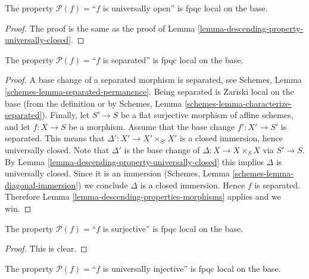 \begin{lemma}
\label{lemma-descending-property-universally-open}
The property $\mathcal{P}(f) =$``$f$ is universally open''
is fpqc local on the base.
\end{lemma}

\begin{proof}
The proof is the same as the proof of
Lemma \ref{lemma-descending-property-universally-closed}.
\end{proof}

\begin{lemma}
\label{lemma-descending-property-separated}
The property $\mathcal{P}(f) =$``$f$ is separated''
is fpqc local on the base.
\end{lemma}

\begin{proof}
A base change of a separated morphism is separated, see
Schemes, Lemma \ref{schemes-lemma-separated-permanence}.
Being separated is Zariski local on the base (from the
definition or by
Schemes, Lemma \ref{schemes-lemma-characterize-separated}).
Finally, let
$S' \to S$ be a flat surjective morphism of affine schemes,
and let $f : X \to S$ be a morphism. Assume that the base change
$f' : X' \to S'$ is separated. This means that
$\Delta' : X' \to X'\times_{S'} X'$ is a closed immersion,
hence universally closed.
Note that $\Delta'$ is the base change of $\Delta : X \to X \times_S X$
via $S' \to S$. By Lemma \ref{lemma-descending-property-universally-closed}
this implies $\Delta$ is universally closed. Since it is
an immersion
(Schemes, Lemma \ref{schemes-lemma-diagonal-immersion})
we conclude $\Delta$ is a closed immersion.
Hence $f$ is separated.
Therefore Lemma \ref{lemma-descending-properties-morphisms} applies and we win.
\end{proof}

\begin{lemma}
\label{lemma-descending-property-surjective}
The property $\mathcal{P}(f) =$``$f$ is surjective''
is fpqc local on the base.
\end{lemma}

\begin{proof}
This is clear.
\end{proof}

\begin{lemma}
\label{lemma-descending-property-universally-injective}
The property $\mathcal{P}(f) =$``$f$ is universally injective''
is fpqc local on the base.
\end{lemma}

